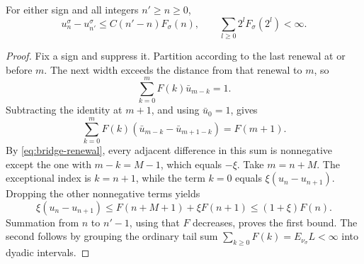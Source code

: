 \begin{lemma}
\label{lem:width-tail}
For either sign and all integers $n'\ge n\ge0$,
\begin{equation}
 u_n^\sigma-u_{n'}^\sigma
   \le C(n'-n)F_\sigma(n),
 \qquad
 \sum_{l\ge0}2^lF_\sigma(2^l)<\infty.
 \label{eq:width-tail-comparison}
\end{equation}
\end{lemma}

\begin{proof}
Fix a sign and suppress it. Partition according to the last renewal at
or before $m$. The next width exceeds the distance from that renewal to
$m$, so
\[
 \sum_{k=0}^m F(k)\bar u_{m-k}=1.
\]
Subtracting the identity at $m+1$, and using $\bar u_0=1$, gives
\[
 \sum_{k=0}^m F(k)
       (\bar u_{m-k}-\bar u_{m+1-k})=F(m+1).
\]
By \eqref{eq:bridge-renewal}, every adjacent difference in this sum is
nonnegative except the one with $m-k=M-1$, which equals $-\xi$.
Take $m=n+M$. The exceptional index is $k=n+1$, while the term $k=0$
equals $\xi(u_n-u_{n+1})$. Dropping the other nonnegative terms yields
\[
 \xi(u_n-u_{n+1})
   \le F(n+M+1)+\xi F(n+1)
   \le(1+\xi)F(n).
\]
Summation from $n$ to $n'-1$, using that $F$ decreases, proves the first
bound. The second follows by grouping the ordinary tail sum
$\sum_{k\ge0}F(k)=E_{\nu_\sigma}L<\infty$ into dyadic intervals.
\end{proof}


